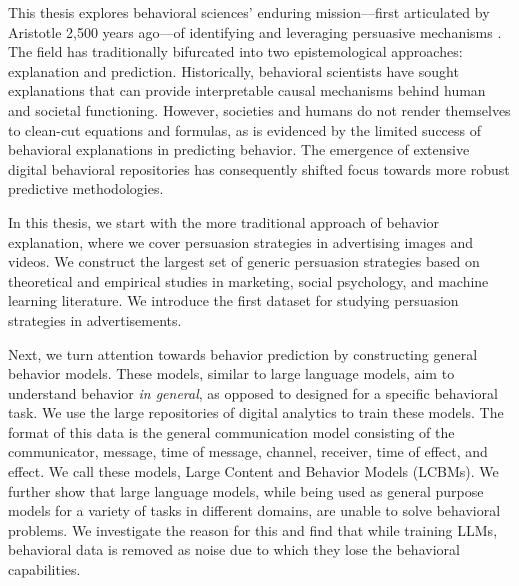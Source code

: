 This thesis explores behavioral sciences' enduring mission—first articulated by Aristotle 2,500 years ago—of identifying and leveraging persuasive mechanisms \cite{rapp2002aristotle}. The field has traditionally bifurcated into two epistemological approaches: explanation and prediction. Historically, behavioral scientists have sought explanations that can provide interpretable causal mechanisms behind human and societal functioning. However, societies and humans do not render themselves to clean-cut equations and formulas, as is evidenced by the limited success of behavioral explanations in predicting behavior. The emergence of extensive digital behavioral repositories has consequently shifted focus towards more robust predictive methodologies.





In this thesis, we start with the more traditional approach of behavior explanation, where we cover persuasion strategies in advertising images and videos. We construct the largest set of generic persuasion strategies based on theoretical and empirical studies in marketing, social psychology, and machine learning literature. We introduce the first dataset for studying persuasion strategies in advertisements. 

Next, we turn attention towards behavior prediction by constructing general behavior models. These models, similar to large language models, aim to understand behavior \textit{in general}, as opposed to designed for a specific behavioral task. We use the large repositories of digital analytics to train these models. The format of this data is the general communication model consisting of the communicator, message, time of message, channel, receiver, time of effect, and effect. We call these models, Large Content and Behavior Models (LCBMs). We further show that large language models, while being used as general purpose models for a variety of tasks in different domains, are unable to solve behavioral problems. We investigate the reason for this and find that while training LLMs, behavioral data is removed as noise due to which they lose the behavioral capabilities.


